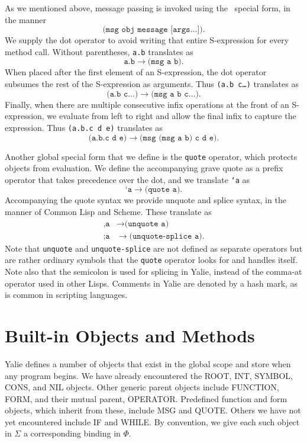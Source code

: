 \documentclass[twocolumn]{article}
\begin{document}
As we mentioned above, message passing is invoked using the \msg\
special form, in the manner
\[\texttt{(msg obj message [args...])}.\]
We supply the dot operator to avoid writing that entire
S-expression for every method call. Without parentheses, \texttt{a.b}
translates as
\[\texttt{a.b}\rightarrow\texttt{(msg a b)}.\]
When placed after the first element of an S-expression, the dot
operator subsumes the rest of the S-expression as arguments. Thus
\texttt{(a.b c\ldots)}  translates as
\[\texttt{(a.b c\ldots)} \rightarrow \texttt{(msg a b c\ldots)}.\]
Finally, when there are multiple consecutive infix operations at the
front of an S-expression, we evaluate from left to right and allow the
final infix to capture the expression. Thus \texttt{(a.b.c d e)}
translates as
\[ \texttt{(a.b.c d e)} \rightarrow \texttt{(msg (msg a b) c d e)}.\]

Another global special form that we define is the \texttt{quote}
operator, which protects objects from evaluation. We define the
accompanying grave quote as a prefix operator that takes precedence
over the dot, and we translate \texttt{`a} as
\[ \texttt{`a} \rightarrow \texttt{(quote a)}.\]
Accompanying the quote syntax we provide unquote and splice syntax, in
the manner of Common Lisp and Scheme. These translate as
\begin{align*}
  \texttt{,a} & \rightarrow \texttt{(unquote a)}\\
  \texttt{;a} & \rightarrow \texttt{(unquote-splice a)}.
\end{align*}
Note that \texttt{unquote} and \texttt{unquote-splice} are not defined
as separate operators but are rather ordinary symbols that the
\texttt{quote} operator looks for and handles itself. Note also that
the semicolon is used for splicing in Yalie, instead of the comma-at
operator used in other Lisps. Comments in Yalie are denoted by a hash
mark, as is common in scripting languages.

\section*{Built-in Objects and Methods}

Yalie defines a number of objects that exist in the global scope and
store when any program begins. We have already encountered the
\textsf{ROOT}, \textsf{INT}, \textsf{SYMBOL}, \textsf{CONS}, and
\textsf{NIL} objects. Other generic parent objects include
\textsf{FUNCTION}, \textsf{FORM}, and their mutual parent,
\textsf{OPERATOR}. Predefined function and form objects, which inherit
from these, include \textsf{MSG} and \textsf{QUOTE}. Others we have
not yet encountered include \textsf{IF} and \textsf{WHILE}. By
convention, we give each such object in $\Sigma$ a corresponding
binding in $\Phi$.
\end{document}
